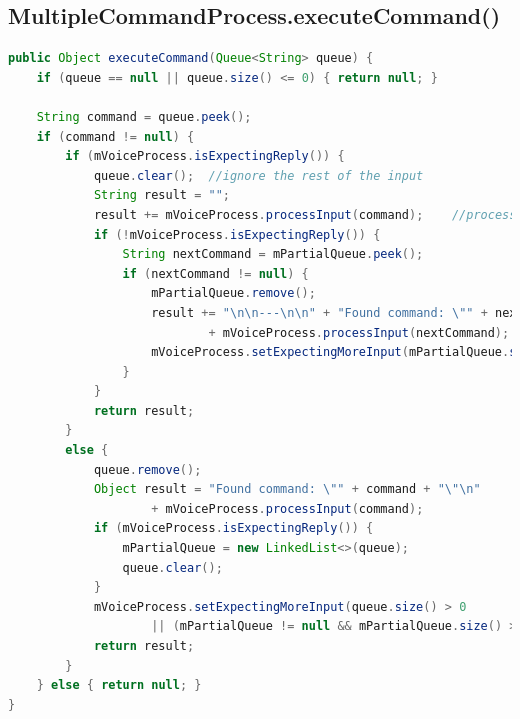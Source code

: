\documentclass[11pt]{article}
\begin{document}
\subsection{MultipleCommandProcess.executeCommand()}
\label{appendix:multiple-commands-execute}
\begin{lstlisting}[language=Java, caption=MultipleCommandProcess.executeCommand()]
public Object executeCommand(Queue<String> queue) {
    if (queue == null || queue.size() <= 0) { return null; }

    String command = queue.peek();
    if (command != null) {
        if (mVoiceProcess.isExpectingReply()) {
            queue.clear();  //ignore the rest of the input
            String result = "";
            result += mVoiceProcess.processInput(command);    //process confirmation
            if (!mVoiceProcess.isExpectingReply()) {
                String nextCommand = mPartialQueue.peek();
                if (nextCommand != null) {
                    mPartialQueue.remove();
                    result += "\n\n---\n\n" + "Found command: \"" + nextCommand + "\"\n"
                            + mVoiceProcess.processInput(nextCommand);
                    mVoiceProcess.setExpectingMoreInput(mPartialQueue.size() > 0);
                }
            }
            return result;
        }
        else {
            queue.remove();
            Object result = "Found command: \"" + command + "\"\n"
                    + mVoiceProcess.processInput(command);
            if (mVoiceProcess.isExpectingReply()) {
                mPartialQueue = new LinkedList<>(queue);
                queue.clear();
            }
            mVoiceProcess.setExpectingMoreInput(queue.size() > 0
                    || (mPartialQueue != null && mPartialQueue.size() > 0));
            return result;
        }
    } else { return null; }
}
\end{lstlisting}

\newpage
\end{document}
